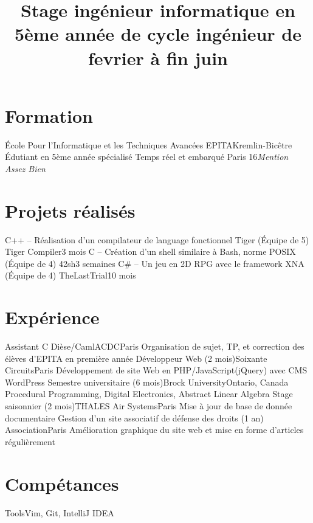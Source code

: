 \documentclass[10pt,a4paper,sans]{moderncv}
\title{Stage ingénieur informatique\newline{} en 5ème année de cycle ingénieur\newline{} de fevrier à fin juin}
\begin{document}
\makecvtitle

\vspace{-1.5\baselineskip}

\section{Formation}
    {École Pour l'Informatique et les Techniques Avancées}
    {EPITA}{Kremlin-Bicêtre}{}
    {Édutiant en 5ème année spécialisé Temps réel et embarqué}
    {Paris 16}{\textit{Mention Assez Bien}}{}

\section{Projets réalisés}
    {C++ --  Réalisation d'un compilateur de language fonctionnel Tiger (Équipe de 5)}
    {Tiger Compiler}{3 mois}{}{}
    {C -- Création d'un shell similaire à Bash, norme POSIX (Équipe de 4)}
    {42sh}{3 semaines}{}{}
    {C\# --  Un jeu en 2D RPG avec le framework XNA (Équipe de 4)}
    {TheLastTrial}{10 mois}{}{}

\section{Expérience}
    {Assistant C Dièse/Caml}{ACDC}{Paris}{}
    {Organisation de sujet, TP, et correction des élèves d'EPITA en première année}
    {Développeur Web (2 mois)}{Soixante Circuits}{Paris}{}
    {Développement de site Web en PHP/JavaScript(jQuery) avec CMS WordPress}
    {Semestre universitaire (6 mois)}{Brock University}{Ontario, Canada}{}
    {Procedural Programming, Digital Electronics, Abstract Linear Algebra}
    {Stage saisonnier (2 mois)}{THALES Air Systems}{Paris}{}
    {Mise à jour de base de donnée documentaire}
    {Gestion d'un site associatif de défense des droits (1 an)}
    {Association}{Paris}{}
    {Amélioration graphique du site web et mise en forme d'articles régulièrement}

\section{Compétances}
    {Tools}{Vim, Git, IntelliJ IDEA}
\end{document}

